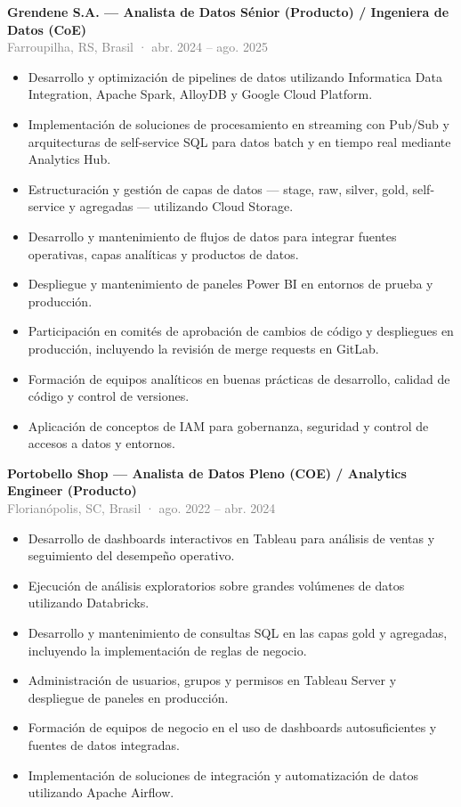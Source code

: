 \documentclass[10pt,a4paper]{article}
\newcommand{\role}[3]{%
  \Needspace{13\baselineskip}%
  \textbf{#1}\\[-1pt]
  {\small\textcolor{grey}{#2}}\\[-1pt]
  #3\par}
\begin{document}
\role{Grendene S.A. — Analista de Datos Sénior (Producto) / Ingeniera de Datos (CoE)}{Farroupilha, RS, Brasil · abr. 2024 – ago. 2025}{
\begin{itemize}
  \item Desarrollo y optimización de pipelines de datos utilizando Informatica Data Integration, Apache Spark, AlloyDB y Google Cloud Platform.
  \item Implementación de soluciones de procesamiento en streaming con Pub/Sub y arquitecturas de self-service SQL para datos batch y en tiempo real mediante Analytics Hub.
  \item Estructuración y gestión de capas de datos — stage, raw, silver, gold, self-service y agregadas — utilizando Cloud Storage.
  \item Desarrollo y mantenimiento de flujos de datos para integrar fuentes operativas, capas analíticas y productos de datos.
  \item Despliegue y mantenimiento de paneles Power BI en entornos de prueba y producción.
  \item Participación en comités de aprobación de cambios de código y despliegues en producción, incluyendo la revisión de merge requests en GitLab.
  \item Formación de equipos analíticos en buenas prácticas de desarrollo, calidad de código y control de versiones.
  \item Aplicación de conceptos de IAM para gobernanza, seguridad y control de accesos a datos y entornos.
\end{itemize}}

\role{Portobello Shop — Analista de Datos Pleno (COE) / Analytics Engineer (Producto)}{Florianópolis, SC, Brasil · ago. 2022 – abr. 2024}{
\begin{itemize}
  \item Desarrollo de dashboards interactivos en Tableau para análisis de ventas y seguimiento del desempeño operativo.
  \item Ejecución de análisis exploratorios sobre grandes volúmenes de datos utilizando Databricks.
  \item Desarrollo y mantenimiento de consultas SQL en las capas gold y agregadas, incluyendo la implementación de reglas de negocio.
  \item Administración de usuarios, grupos y permisos en Tableau Server y despliegue de paneles en producción.
  \item Formación de equipos de negocio en el uso de dashboards autosuficientes y fuentes de datos integradas.
  \item Implementación de soluciones de integración y automatización de datos utilizando Apache Airflow.
\end{itemize}}
\end{document}
